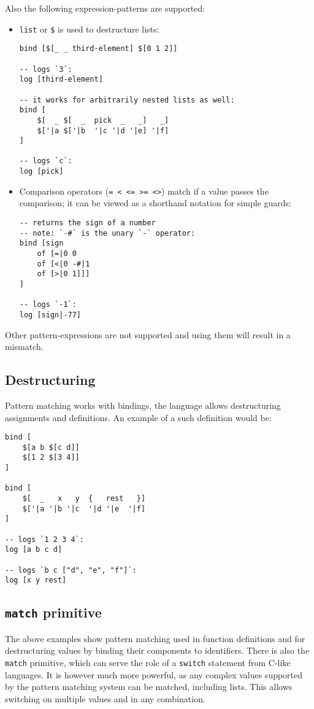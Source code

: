 Also the following expression-patterns are supported:
\begin{itemize}
    \item \texttt{list} or \texttt{\$} is used to destructure lists:
\begin{lstlisting}
bind [$[_ _ third-element] $[0 1 2]]

-- logs `3`:
log [third-element]

-- it works for arbitrarily nested lists as well:
bind [
    $[  _ $[  _  pick  _   _]   _] 
    $['|a $['|b  '|c '|d '|e] '|f]
]

-- logs `c`:
log [pick]
\end{lstlisting}

    \item Comparison operators (\texttt{= < <= >= <>}) match if a value
      passes the comparison; it can be viewed as a shorthand notation for
      simple
      guards\cite[Chapter~Pattern Matching Basics, Section Using Guards within Patterns]{f_sharp_wikibooks}:
\begin{lstlisting}
-- returns the sign of a number
-- note: `-#` is the unary `-` operator:
bind [sign
    of [=|0 0
    of [<|0 -#|1
    of [>|0 1]]]
]

-- logs `-1`:
log [sign|-77]
\end{lstlisting}
\end{itemize}

Other pattern-expressions are not supported and using them will result in a mismatch.

\subsection{Destructuring}
Pattern matching works with bindings, the language allows destructuring assignments and definitions\cite{mdn_destructuring}. An example of a such definition would be:
\begin{lstlisting}
bind [
    $[a b $[c d]]
    $[1 2 $[3 4]]
]

bind [
    $[  _   x   y  {   rest   }]
    $['|a '|b '|c  '|d '|e  '|f]
]

-- logs `1 2 3 4`:
log [a b c d]

-- logs `b c ["d", "e", "f"]`:
log [x y rest]
\end{lstlisting}

\subsection{\texttt{match} primitive}\label{sub:match}
The above examples show pattern matching used in function definitions and for destructuring values by binding their components to identifiers. There is also the \texttt{match} primitive, which can serve the role of a \texttt{switch} statement from C-like languages. It is however much more powerful, as any complex values supported by the pattern matching system can be matched, including lists. This allows switching on multiple values and in any combination.

